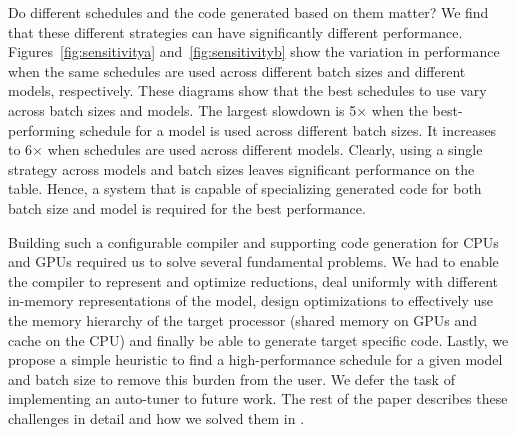 Do different schedules and the code generated based on them matter? 
We find that these different strategies can have significantly different
performance. Figures~\ref{fig:sensitivitya} and~\ref{fig:sensitivityb} show the
variation in performance when the same schedules are used across different batch sizes 
and different models, respectively. 
These diagrams show that the best schedules to use vary across batch sizes and models. 
The largest slowdown is 5$\times$ 
when the best-performing schedule for a model is  
used across different batch sizes.  %
It increases to 6$\times$ when schedules are used across different models. 
Clearly, using a single strategy across models and batch sizes leaves significant performance on the table. Hence, 
a system that is capable of specializing generated code for both batch 
size and model is required for the best performance.

Building such a configurable compiler and supporting code generation for CPUs and GPUs 
required us to solve several fundamental problems. We had to enable the
compiler to represent and optimize reductions, deal uniformly with different
in-memory representations of the model, design optimizations to effectively 
use the memory hierarchy of the target processor (shared memory on GPUs and 
cache on the CPU) and finally be able to generate target specific code. 
Lastly, we propose a simple heuristic to find a high-performance schedule 
for a given model and batch size to remove this burden from the user. 
We defer the task of implementing an auto-tuner to future work. 
The rest of the paper describes these challenges in detail and how we
solved them in \Treebeard{}.

